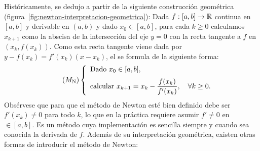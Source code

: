 Históricamente, se dedujo a partir de la siguiente
construcción geométrica
(figura~\ref{fig:newton-interpretacion-geometrica}): Dada
$f:[a,b]\to\operatorname{{\mathbb R}}$ continua en $[a,b]$ y derivable en $(a,b)$ y dado
$x_0\in [a,b]$, para cada $k\ge 0$ calculamos $x_{k+1}$ como la
abscisa de la intersección del eje $y=0$ con la recta tangente a $f$
en $(x_k,f(x_k))$. Como esta recta tangente viene dada por
$y-f(x_k) = f'(x_k)(x-x_k)$, el  se formula de la siguiente forma:
\begin{equation}
  \tag{$M_{\text{N}}$}
  \left\{
    \begin{array}{l}
      \text{Dado } x_0\in [a,b], \\ \noalign{\medskip}
      \text{calcular } x_{k+1} = x_k - \dfrac{f(x_k)}{f'(x_k)} , \quad \forall k\ge 0.
    \end{array}
  \right.
  \label{eq:MetNewton}
\end{equation}
Obsérvese que para que el método de Newton esté bien definido debe ser
$f'(x_k)\neq 0$ para todo $k$, lo que en la práctica requiere asumir
$f'\neq 0$ en $\in [a,b]$. Es un método cuya implementación es
sencilla siempre y cuando sea conocida la derivada de  $f$.
Además de su interpretación geométrica, existen otras formas de
introducir el método de Newton:
